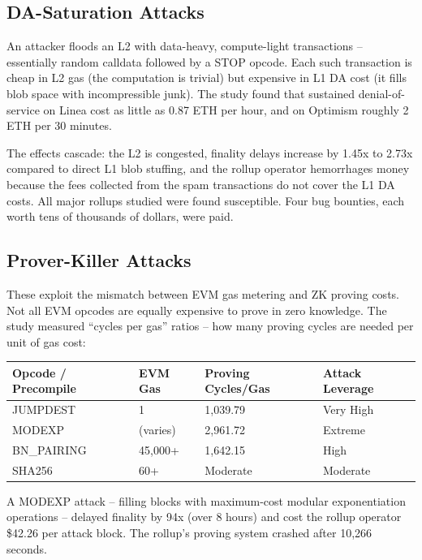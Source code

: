 \documentclass[
  11pt,
  openany]{report}
\begin{document}
\subsection{DA-Saturation Attacks}\label{da-saturation-attacks}

An attacker floods an L2 with data-heavy, compute-light transactions --
essentially random calldata followed by a STOP opcode. Each such transaction is
cheap in L2 gas (the computation is trivial) but expensive in L1 DA cost (it
fills blob space with incompressible junk). The study found that sustained
denial-of-service on Linea cost as little as 0.87 ETH per hour, and on Optimism
roughly 2 ETH per 30 minutes.

The effects cascade: the L2 is congested, finality delays increase by 1.45x to
2.73x compared to direct L1 blob stuffing, and the rollup operator hemorrhages
money because the fees collected from the spam transactions do not cover the L1
DA costs. All major rollups studied were found susceptible. Four bug bounties,
each worth tens of thousands of dollars, were paid.

\subsection{Prover-Killer Attacks}\label{prover-killer-attacks}

These exploit the mismatch between EVM gas metering and ZK proving costs. Not
all EVM opcodes are equally expensive to prove in zero knowledge. The study
measured ``cycles per gas'' ratios -- how many proving cycles are needed per
unit of gas cost:

\begin{longtable}[]{@{}llll@{}}
\toprule\noalign{}
Opcode / Precompile & EVM Gas & Proving Cycles/Gas & Attack Leverage \\
\midrule\noalign{}
\arrayrulecolor{MidnightBlue}\midrule\arrayrulecolor{MidnightBorder}
\endhead
\bottomrule\noalign{}
\endlastfoot
JUMPDEST & 1 & 1,039.79 & Very High \\
MODEXP & (varies) & 2,961.72 & Extreme \\
BN\_PAIRING & 45,000+ & 1,642.15 & High \\
SHA256 & 60+ & Moderate & Moderate \\
\end{longtable}

A MODEXP attack -- filling blocks with maximum-cost modular exponentiation
operations -- delayed finality by 94x (over 8 hours) and cost the rollup
operator \$42.26 per attack block. The rollup's proving system crashed after
10,266 seconds.
\end{document}
